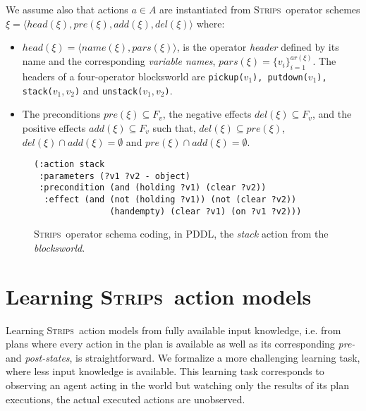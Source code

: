 \documentclass{article}
\newcommand{\tup}[1]{{\langle #1 \rangle}}
\newcommand{\strips}{\textsc{Strips}}     %
\begin{document}
We assume also that actions $a\in A$ are instantiated from \strips\ operator schemes $\xi=\tup{head(\xi),pre(\xi),add(\xi),del(\xi)}$ where:
\begin{itemize}
\item $head(\xi)=\tup{name(\xi),pars(\xi)}$, is the operator {\em header} defined by its name and the corresponding {\em variable names}, $pars(\xi)=\{v_i\}_{i=1}^{ar(\xi)}$. The headers of a four-operator blocksworld are {\small\tt pickup($v_1$), putdown($v_1$), stack($v_1,v_2$)} and {\small\tt unstack($v_1,v_2$)}.
\item The preconditions $pre(\xi)\subseteq F_v$, the negative effects $del(\xi)\subseteq F_v$, and the positive effects $add(\xi)\subseteq F_v$ such that, $del(\xi)\subseteq pre(\xi)$, $del(\xi)\cap add(\xi)=\emptyset$ and $pre(\xi)\cap add(\xi)=\emptyset$.
\end{itemize}


\begin{figure}
\begin{scriptsize}
\begin{verbatim}
(:action stack
 :parameters (?v1 ?v2 - object)
 :precondition (and (holding ?v1) (clear ?v2))
  :effect (and (not (holding ?v1)) (not (clear ?v2))
               (handempty) (clear ?v1) (on ?v1 ?v2)))
\end{verbatim}
\end{scriptsize}
 \caption{\small \strips\ operator schema coding, in PDDL, the {\em stack} action from the {\em blocksworld}.}
\label{fig:stack}
\end{figure}

\section{Learning \strips\ action models}
Learning \strips\ action models from fully available input knowledge, i.e. from plans where every action in the plan is available as well as its corresponding {\em pre-} and {\em post-states}, is straightforward. %
We formalize a more challenging learning task, where less input knowledge is available. This learning task corresponds to observing an agent acting in the world but watching only the results of its plan executions, the actual executed actions are unobserved.
\end{document}
